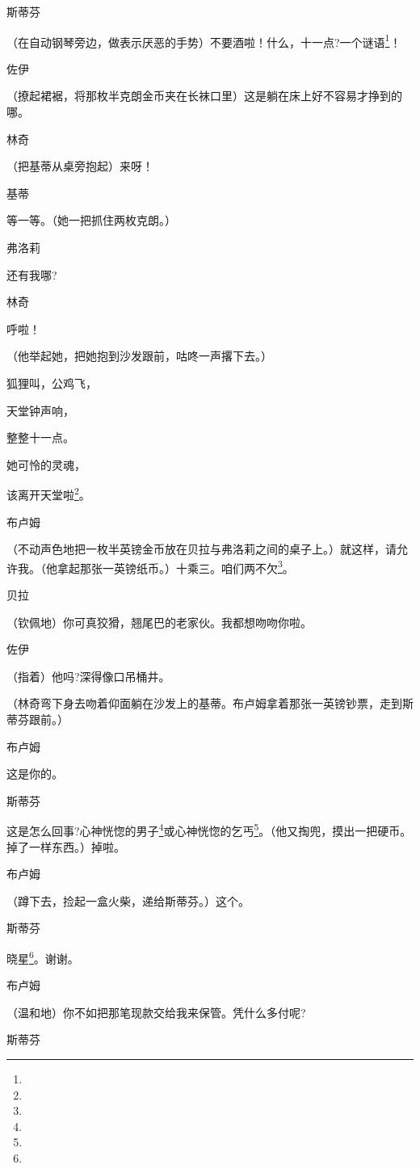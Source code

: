 \par 斯蒂芬
\par （在自动钢琴旁边，做表示厌恶的手势）不要酒啦！什么，十一点?一个谜语\footnote{}！
\par 佐伊
\par （撩起裙裾，将那枚半克朗金币夹在长袜口里）这是躺在床上好不容易才挣到的哪。
\par 林奇
\par （把基蒂从桌旁抱起）来呀！
\par 基蒂
\par 等一等。（她一把抓住两枚克朗。）
\par 弗洛莉
\par 还有我哪?
\par 林奇
\par 呼啦！
\par （他举起她，把她抱到沙发跟前，咕咚一声撂下去。）
\par 狐狸叫，公鸡飞，
\par 天堂钟声响，
\par 整整十一点。
\par 她可怜的灵魂，
\par 该离开天堂啦\footnote{}。
\par 布卢姆
\par （不动声色地把一枚半英镑金币放在贝拉与弗洛莉之间的桌子上。）就这样，请允许我。（他拿起那张一英镑纸币。）十乘三。咱们两不欠\footnote{}。
\par 贝拉
\par （钦佩地）你可真狡猾，翘尾巴的老家伙。我都想吻吻你啦。
\par 佐伊
\par （指着）他吗?深得像口吊桶井。
\par （林奇弯下身去吻着仰面躺在沙发上的基蒂。布卢姆拿着那张一英镑钞票，走到斯蒂芬跟前。）
\par 布卢姆
\par 这是你的。
\par 斯蒂芬
\par 这是怎么回事?心神恍惚的男子\footnote{}或心神恍惚的乞丐\footnote{}。（他又掏兜，摸出一把硬币。掉了一样东西。）掉啦。
\par 布卢姆
\par （蹲下去，捡起一盒火柴，递给斯蒂芬。）这个。
\par 斯蒂芬
\par 晓星\footnote{}。谢谢。
\par 布卢姆
\par （温和地）你不如把那笔现款交给我来保管。凭什么多付呢?
\par 斯蒂芬
